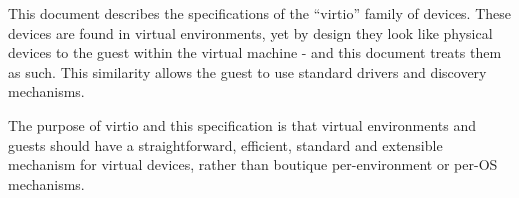 This document describes the specifications of the “virtio” family of
devices. These devices are found in virtual environments, yet by
design they look like physical devices to the guest
within the virtual machine - and this
document treats them as such. This similarity allows the guest to use standard
drivers and discovery mechanisms.

The purpose of virtio and this specification is that virtual
environments and guests should have a straightforward, efficient,
standard and extensible mechanism for virtual devices, rather
than boutique per-environment or per-OS mechanisms.
